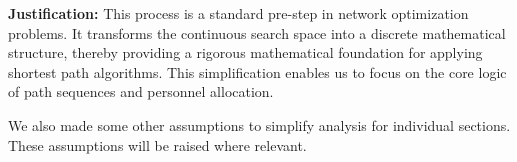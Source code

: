 \textbf{Justification:} This process is a standard pre-step in network optimization problems. It transforms the continuous search space into a discrete mathematical structure, thereby providing a rigorous mathematical foundation for applying shortest path algorithms. This simplification enables us to focus on the core logic of path sequences and personnel allocation.

We also made some other assumptions to simplify analysis for individual sections. These assumptions will be raised where relevant.
\vspace{-0.5cm}%
